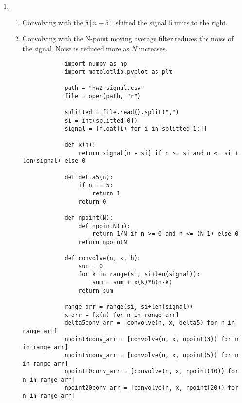 \documentclass[10pt,a4paper, margin=1in]{article}
\begin{document}
\begin{enumerate}
\item %
    \begin{enumerate}
    \item %
        \begin{figure}[H]
            
            \centering
        \end{figure}
        

        Convolving with the $\delta[n-5]$ shifted the signal $5$ units to the right.
    \item %
        
        \newline
        
        \newline
        
        \newline
        

        Convolving with the N-point moving average filter reduces the noise of the signal. Noise is reduced more as $N$ increases.

        \begin{verbatim}
            import numpy as np
            import matplotlib.pyplot as plt

            path = "hw2_signal.csv"
            file = open(path, "r")

            splitted = file.read().split(",")
            si = int(splitted[0])
            signal = [float(i) for i in splitted[1:]]

            def x(n):
                return signal[n - si] if n >= si and n <= si + len(signal) else 0

            def delta5(n):
                if n == 5: 
                    return 1
                return 0

            def npoint(N):
                def npointN(n):
                    return 1/N if n >= 0 and n <= (N-1) else 0
                return npointN

            def convolve(n, x, h):
                sum = 0
                for k in range(si, si+len(signal)):
                    sum = sum + x(k)*h(n-k)
                return sum

            range_arr = range(si, si+len(signal))
            x_arr = [x(n) for n in range_arr]
            delta5conv_arr = [convolve(n, x, delta5) for n in range_arr]
            npoint3conv_arr = [convolve(n, x, npoint(3)) for n in range_arr]
            npoint5conv_arr = [convolve(n, x, npoint(5)) for n in range_arr]
            npoint10conv_arr = [convolve(n, x, npoint(10)) for n in range_arr]
            npoint20conv_arr = [convolve(n, x, npoint(20)) for n in range_arr]


\end{verbatim}
\end{enumerate}
\end{enumerate}
\end{document}
